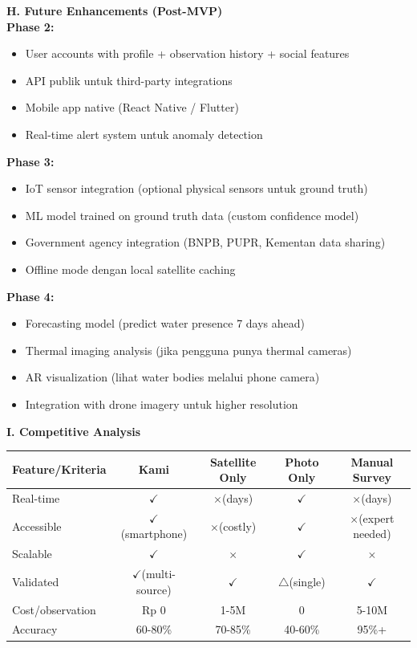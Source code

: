 \documentclass[12pt,a4paper]{article}
\newcommand{\subsectionbox}[1]{%
  \textbf{\large #1}\\[0.3cm]
}
\newcommand{\greencheck}{$\checkmark$}
\newcommand{\redcross}{$\times$}
\newcommand{\warnsign}{$\triangle$}
\begin{document}
\vspace{0.5cm}

\subsectionbox{H. Future Enhancements (Post-MVP)}

\textbf{Phase 2:}
\begin{itemize}
  \item User accounts with profile + observation history + social features
  \item API publik untuk third-party integrations
  \item Mobile app native (React Native / Flutter)
  \item Real-time alert system untuk anomaly detection
\end{itemize}

\textbf{Phase 3:}
\begin{itemize}
  \item IoT sensor integration (optional physical sensors untuk ground truth)
  \item ML model trained on ground truth data (custom confidence model)
  \item Government agency integration (BNPB, PUPR, Kementan data sharing)
  \item Offline mode dengan local satellite caching
\end{itemize}

\textbf{Phase 4:}
\begin{itemize}
  \item Forecasting model (predict water presence 7 days ahead)
  \item Thermal imaging analysis (jika pengguna punya thermal cameras)
  \item AR visualization (lihat water bodies melalui phone camera)
  \item Integration with drone imagery untuk higher resolution
\end{itemize}

\vspace{0.5cm}

\subsectionbox{I. Competitive Analysis}

\begin{center}
\small
\begin{tabularx}{\textwidth}{|l|c|c|c|c|}
  \hline
  \textbf{Feature/Kriteria} & \textbf{Kami} & \textbf{Satellite Only} & \textbf{Photo Only} & \textbf{Manual Survey} \\
  \hline
  Real-time & \greencheck & \redcross (days) & \greencheck & \redcross (days) \\
  Accessible & \greencheck (smartphone) & \redcross (costly) & \greencheck & \redcross (expert needed) \\
  Scalable & \greencheck & \redcross & \greencheck & \redcross \\
  Validated & \greencheck (multi-source) & \greencheck & \warnsign (single) & \greencheck \\
  Cost/observation & Rp 0 & 1-5M & 0 & 5-10M \\
  Accuracy & 60-80\% & 70-85\% & 40-60\% & 95\%+ \\
  \hline
\end{tabularx}
\end{center}
\end{document}
